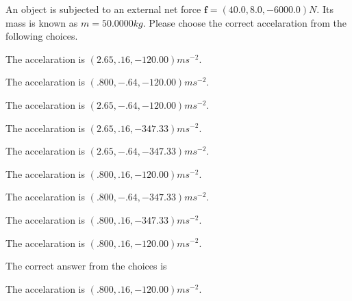 \documentclass[12pt]{article}
\begin{document}
 
 
An object is subjected to an external net force $\mathbf{f}=
(40.0 , 8.0 , -6000.0) N$.
Its mass is known as $m= %
50.0000 kg$. Please choose the
correct accelaration from the following choices.
 
 
 
The accelaration is $  %
(
2.65,
.16,
-120.00)
ms^{-2} $.
 
 
The accelaration is $  %
(
.800,
-.64,
-120.00)
ms^{-2} $.
 
 
The accelaration is $  %
(
2.65,
-.64,
-120.00)
ms^{-2} $.
 
 
The accelaration is $  %
(
2.65,
.16,
-347.33)
ms^{-2} $.
 
 
The accelaration is $  %
(
2.65,
-.64,
-347.33)
ms^{-2} $.
 
 
The accelaration is $  %
(
.800,
.16,
-120.00)
ms^{-2} $.
 
 
The accelaration is $  %
(
.800,
-.64,
-347.33)
ms^{-2} $.
 
 
The accelaration is $  %
(
.800,
.16,
-347.33)
ms^{-2} $.
 
 
\noindent{}
 
 
The accelaration is $  %
(
.800,
.16,
-120.00)
ms^{-2} $.
 
 
\noindent{}
 
 
 
 
 
\noindent{}
 
 

The correct answer from the choices is


The accelaration is $  %
(
.800,
.16,
-120.00)
ms^{-2} $.
 
 
 
\noindent{}
 
 

 
 
 
\noindent{}
 
\end{document}
